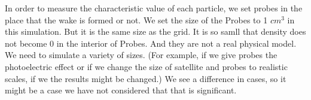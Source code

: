 

In order to measure the characteristic value of each particle, we set probes in the
place that the wake is formed or not. 
We set the size of the Probes to 1 $cm^3$ in this simulation. But it is the same size as the grid.
It is so samll that density does not become 0 in the interior of Probes. And they are not a real 
physical model. We need to simulate a variety of sizes.
(For example, if we give probes the photoelectric effect or if we change the size of satellite and 
probes to realistic scales, if we the results might be changed.)
We see a difference in cases, so it might be a case we have not considered that that is significant.
